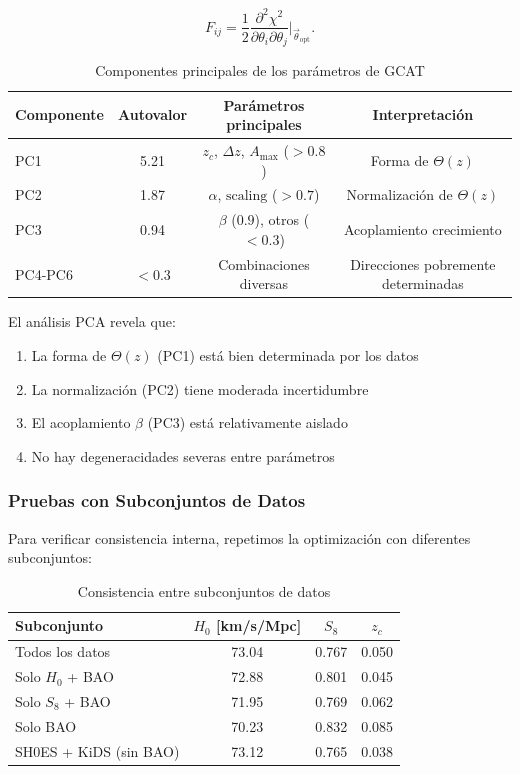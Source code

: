 \documentclass[12pt, a4paper]{article}
\theoremstyle{plain}
\theoremstyle{definition}
\begin{document}
\begin{equation}
F_{ij} = \frac{1}{2}\frac{\partial^2\chi^2}{\partial\theta_i\partial\theta_j}\Big|_{\vec{\theta}_{\text{opt}}}.
\end{equation}

\begin{table}[h]
\centering
\caption{Componentes principales de los parámetros de GCAT}
\label{tab:pca_analysis}
\begin{tabular}{lccc}
\toprule
\textbf{Componente} & \textbf{Autovalor} & \textbf{Parámetros principales} & \textbf{Interpretación} \\
\midrule
PC1 & 5.21 & $z_c$, $\Delta z$, $A_{\max}$ ($>0.8$) & Forma de $\Theta(z)$ \\
PC2 & 1.87 & $\alpha$, $\text{scaling}$ ($>0.7$) & Normalización de $\Theta(z)$ \\
PC3 & 0.94 & $\beta$ ($0.9$), otros ($<0.3$) & Acoplamiento crecimiento \\
PC4-PC6 & $<0.3$ & Combinaciones diversas & Direcciones pobremente determinadas \\
\bottomrule
\end{tabular}
\end{table}

El análisis PCA revela que:
\begin{enumerate}
    \item La forma de $\Theta(z)$ (PC1) está bien determinada por los datos
    \item La normalización (PC2) tiene moderada incertidumbre
    \item El acoplamiento $\beta$ (PC3) está relativamente aislado
    \item No hay degeneracidades severas entre parámetros
\end{enumerate}

\subsubsection{Pruebas con Subconjuntos de Datos}

Para verificar consistencia interna, repetimos la optimización con diferentes subconjuntos:

\begin{table}[h]
\centering
\caption{Consistencia entre subconjuntos de datos}
\label{tab:subsets_consistency}
\begin{tabular}{lccc}
\toprule
\textbf{Subconjunto} & $H_0$ [km/s/Mpc] & $S_8$ & $z_c$ \\
\midrule
Todos los datos & 73.04 & 0.767 & 0.050 \\
Solo $H_0$ + BAO & 72.88 & 0.801 & 0.045 \\
Solo $S_8$ + BAO & 71.95 & 0.769 & 0.062 \\
Solo BAO & 70.23 & 0.832 & 0.085 \\
SH0ES + KiDS (sin BAO) & 73.12 & 0.765 & 0.038 \\
\bottomrule
\end{tabular}
\end{table}
\end{document}
